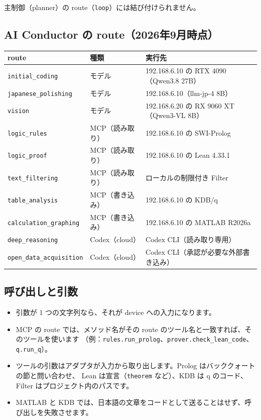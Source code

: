 \documentclass[a4paper,11pt]{ltjsarticle}
\begin{document}
主制御（planner）の route（\texttt{loop}）には結び付けられません。

\subsection{AI Conductor の route（2026年9月時点）}

{\small
\begin{longtable}{p{44mm}p{27mm}p{72mm}}
\toprule
route & 種類 & 実行先 \\
\midrule
\endhead
\texttt{initial\_coding} & モデル & 192.168.6.10 の RTX 4090（Qwen3.8 27B） \\
\texttt{japanese\_polishing} & モデル & 192.168.6.10（llm-jp-4 8B） \\
\texttt{vision} & モデル & 192.168.6.20 の RX 9060 XT（Qwen3-VL 8B） \\
\texttt{logic\_rules} & MCP（読み取り） & 192.168.6.10 の SWI-Prolog \\
\texttt{logic\_proof} & MCP（読み取り） & 192.168.6.10 の Lean 4.33.1 \\
\texttt{text\_filtering} & MCP（読み取り） & ローカルの制限付き Filter \\
\texttt{table\_analysis} & MCP（書き込み） & 192.168.6.10 の KDB/q \\
\texttt{calculation\_graphing} & MCP（書き込み） & 192.168.6.10 の MATLAB R2026a \\
\texttt{deep\_reasoning} & Codex（cloud） & Codex CLI（読み取り専用） \\
\texttt{open\_data\_acquisition} & Codex（cloud） & Codex CLI（承認が必要な外部書き込み） \\
\bottomrule
\end{longtable}}

\subsection{呼び出しと引数}

\begin{itemize}
  \item 引数が 1 つの文字列なら、それが device への入力になります。
  \item MCP の route では、メソッド名がその route のツール名と一致すれば、そのツールを使います
        （例：\texttt{rules.run\_prolog}、\texttt{prover.check\_lean\_code}、\texttt{q.run\_q}）。
  \item ツールの引数はアダプタが入力から取り出します。Prolog はバッククォートの節と問い合わせ、
        Lean は宣言（\texttt{theorem} など）、KDB は q のコード、Filter はプロジェクト内のパスです。
  \item MATLAB と KDB では、日本語の文章をコードとして送ることはせず、呼び出しを失敗させます。
\end{itemize}
\end{document}
